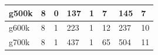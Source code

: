\documentclass[12pt,psfig,a4]{article}
\begin{document}
\begin{table}[ht]
\begin{center}
\begin{tabular}{|l|l|l|l|l|l|l|l|}
g500k& \hspace{0.2in}8 & \hspace{0.2in}0 & \hspace{0.2in}137& \hspace{0.2in}1& \hspace{0.2in}7& \hspace{0.2in}145& \hspace{0.2in}7   \\ \hline 
g600k& \hspace{0.2in}8 & \hspace{0.2in}1 & \hspace{0.2in}223& \hspace{0.2in}1& \hspace{0.2in}12& \hspace{0.2in}237& \hspace{0.2in}10 \\ \hline 
g700k& \hspace{0.2in}8 & \hspace{0.2in}1 & \hspace{0.2in}437& \hspace{0.2in}1& \hspace{0.2in}65& \hspace{0.2in}504& \hspace{0.2in}11 \\ \hline 
\end {tabular}
\end {center}
\end {table}
\normalsize
\end{document}
